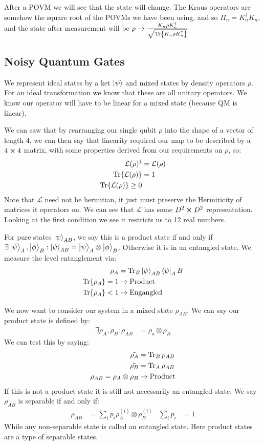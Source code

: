 After a POVM we will see that the state will change. 
The Kraus operators are somehow the square root of the POVMs we have been using, and so $\Pi_n = K_n^\dagger K_n$, and the state after measurement will be $\rho \to \frac{K_n\rho K_n^\dagger}{\sqrt{\Tr{K_n\rho K_n^\dagger}}}$
\subsection{Noisy Quantum Gates}
We represent ideal states by a ket $\ket{\psi}$ and mixed states by density operators $\rho$.
For an ideal transformation we know that these are all unitary operators. We know our operator will have to be linear for a mixed state (because QM is linear).

We can saw that by rearranging our single qubit $\rho$ into the shape of a vector of length 4, we can then say that linearity required our map to be described by a $4\cross4$ matrix, with some properties derived from our requirements on $\rho$, so:
\begin{align*}
	\mathcal{L}(\rho)^\dagger &= \mathcal{L}(\rho) \\
	\Tr{\mathcal{L}(\rho)} &= 1 \\
	\Tr{\mathcal{L}(\rho)} \geq 0
\end{align*}
Note that $\mathcal{L}$ need not be hermitian, it just must preserve the Hermiticity of matrices it operators on. We can see that $\mathcal{L}$ has some $D^2\cross D^2$ representation.
Looking at the first condition we see it restricts us to 12 real numbers.

For pure states $\ket{\psi}_{AB}$, we say this is a product state if and only if $\exists \ket{\tilde{\psi}}_A,\ket{\tilde{\phi}}_B: \ket{\psi}_{AB} = \ket{\tilde{\psi}}_A \otimes\ket{\tilde{\phi}}_B$. Otherwise it is in an entangled state.
We measure the level entanglement via:
\begin{align*}
	\rho_A &= \Tr_B \ket{\psi}_{AB}\bra{\psi}_AB \\
	\Tr{\rho_A} = 1 &\to \text{Product} \\
	\Tr{\rho_A} < 1 &\to \text{Engangled}
\end{align*}

We now want to consider our system in a mixed state $\rho_{AB}$. We can say our product state is defined by:
\begin{align*}
	\exists \rho_A,\rho_B : \rho_{AB} &= \rho_a\otimes\rho_B
\end{align*}
We can test this by saying:
\begin{align*}
	\tilde{\rho_A} &= \Tr_B \rho_{AB} \\
	\tilde{\rho_B} &= \Tr_A \rho_{AB} \\
	\rho_{AB} = \rho_A \otimes \rho_B &\to \text{Product}
\end{align*}
If this is not a product state it is still not necessarily an entangled state. We say $\rho_{AB}$ is separable if and only if:
\begin{align*}
	\rho_{AB} &= \sum_i p_i \rho_A^{(i)}\otimes \rho_B^{(i)} & 
	\sum_i p_i &= 1
\end{align*}
While any non-separable state is called an entangled state. Here product states are a type of separable states.

